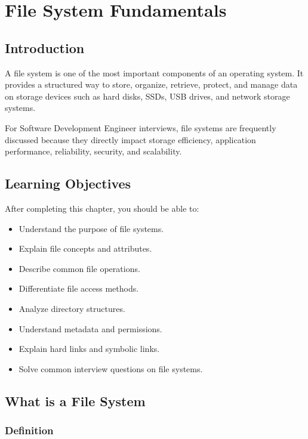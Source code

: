 \chapter{File System Fundamentals}

\section{Introduction}

A file system is one of the most important components of an operating system. It provides a structured way to store, organize, retrieve, protect, and manage data on storage devices such as hard disks, SSDs, USB drives, and network storage systems.

For Software Development Engineer interviews, file systems are frequently discussed because they directly impact storage efficiency, application performance, reliability, security, and scalability.

\section{Learning Objectives}

After completing this chapter, you should be able to:

\begin{itemize}
\item Understand the purpose of file systems.
\item Explain file concepts and attributes.
\item Describe common file operations.
\item Differentiate file access methods.
\item Analyze directory structures.
\item Understand metadata and permissions.
\item Explain hard links and symbolic links.
\item Solve common interview questions on file systems.
\end{itemize}

\section{What is a File System}

\subsection{Definition}

